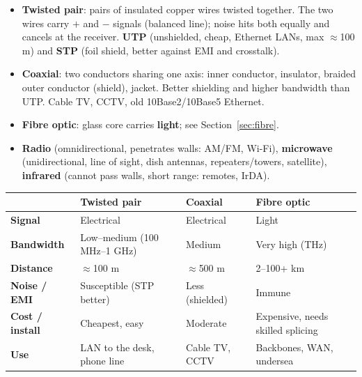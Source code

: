 \documentclass[10pt]{article}
\begin{document}
\begin{itemize}
\item \textbf{Twisted pair}: pairs of insulated copper wires twisted together. The two wires carry $+$ and $-$ signals (balanced line); noise hits both equally and cancels at the receiver. \textbf{UTP} (unshielded, cheap, Ethernet LANs, max $\approx$100 m) and \textbf{STP} (foil shield, better against EMI and crosstalk).
\item \textbf{Coaxial}: two conductors sharing one axis: inner conductor, insulator, braided outer conductor (shield), jacket. Better shielding and higher bandwidth than UTP. Cable TV, CCTV, old 10Base2/10Base5 Ethernet.
\item \textbf{Fibre optic}: glass core carries \textbf{light}; see Section~\ref{sec:fibre}.
\item \textbf{Radio} (omnidirectional, penetrates walls: AM/FM, Wi-Fi), \textbf{microwave} (unidirectional, line of sight, dish antennas, repeaters/towers, satellite), \textbf{infrared} (cannot pass walls, short range: remotes, IrDA).
\end{itemize}

\begin{center}\small
\begin{tabularx}{\linewidth}{@{}>{\bfseries}lXXX@{}}
\toprule
 & Twisted pair & Coaxial & Fibre optic\\\midrule
Signal & Electrical & Electrical & Light\\
Bandwidth & Low--medium (100 MHz--1 GHz) & Medium & Very high (THz)\\
Distance & $\approx$100 m & $\approx$500 m & 2--100+ km\\
Noise / EMI & Susceptible (STP better) & Less (shielded) & Immune\\
Cost / install & Cheapest, easy & Moderate & Expensive, needs skilled splicing\\
Use & LAN to the desk, phone line & Cable TV, CCTV & Backbones, WAN, undersea\\
\bottomrule
\end{tabularx}
\end{center}
\end{document}
